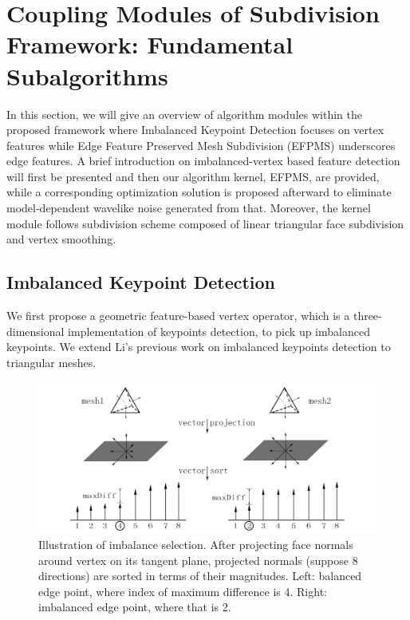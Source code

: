 \documentclass[10pt, conference, compsocconf]{IEEEtran}
\begin{document}

\section{Coupling Modules of Subdivision Framework: Fundamental Subalgorithms}\label{Section:Fundamental Subalgorithms}
In this section, we will give an overview of algorithm modules within the proposed framework where Imbalanced Keypoint Detection focuses on vertex features while Edge Feature Preserved Mesh Subdivision (EFPMS) underscores edge features. A brief introduction on imbalanced-vertex based feature detection will first be presented and then our algorithm kernel, EFPMS, are provided, while a corresponding optimization solution is proposed afterward to eliminate model-dependent wavelike noise generated from that. Moreover, the kernel module follows subdivision scheme composed of linear triangular face subdivision and vertex smoothing.


\subsection{Imbalanced Keypoint Detection}
We first propose a geometric feature-based vertex operator, which is a three-dimensional implementation of keypoints detection, to pick up imbalanced keypoints. We extend Li's  previous work \cite{Li2008Interest} on imbalanced keypoints detection to triangular meshes.

\begin{figure}[!tb]
  \centering
  \includegraphics[width=\linewidth]{./Figure/ImbalancedKeypointsDetection.png}
  \caption{Illustration of imbalance selection. After projecting face normals around vertex on its tangent plane, projected normals (suppose 8 directions) are sorted in terms of their magnitudes. Left: balanced edge point, where index of maximum difference is 4. Right: imbalanced edge point, where that is 2.}\label{Figure_Imbalanced_Keypoint_Selection}
\end{figure}
\end{document}
